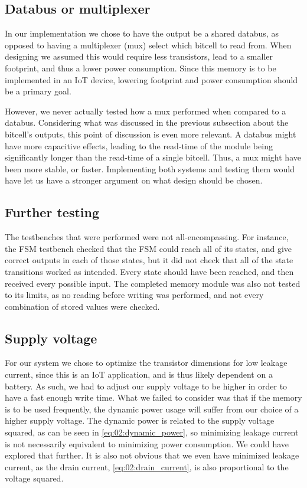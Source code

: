\subsection{Databus or multiplexer}
In our implementation we chose to have the output be a shared databus, as opposed to having a multiplexer (mux) select which bitcell to read from. When designing we assumed this would require less transistors, lead to a smaller footprint, and thus a lower power consumption. Since this memory is to be implemented in an IoT device, lowering footprint and power consumption should be a primary goal.

However, we never actually tested how a mux performed when compared to a databus. Considering what was discussed in the previous subsection about the bitcell's outputs, this point of discussion is even more relevant. A databus might have more capacitive effects, leading to the read-time of the module being significantly longer than the read-time of a single bitcell. Thus, a mux might have been more stable, or faster. Implementing both systems and testing them would have let us have a stronger argument on what design should be chosen.

\subsection{Further testing}
The testbenches that were performed were not all-encompassing. For instance, the FSM testbench checked that the FSM could reach all of its states, and give correct outputs in each of those states, but it did not check that all of the state transitions worked as intended. Every state should have been reached, and then received every possible input. The completed memory module was also not tested to its limits, as no reading before writing was performed, and not every combination of stored values were checked.

\subsection{Supply voltage}
For our system we chose to optimize the transistor dimensions for low leakage current, since this is an IoT application, and is thus likely dependent on a battery. As such, we had to adjust our supply voltage to be higher in order to have a fast enough write time. What we failed to consider was that if the memory is to be used frequently, the dynamic power usage will suffer from our choice of a higher supply voltage. The dynamic power is related to the supply voltage squared, as can be seen in \autoref{eq:02:dynamic_power}, so minimizing leakage current is not necessarily equivalent to minimizing power consumption. We could have explored that further. It is also not obvious that we even have minimized leakage current, as the drain current, \autoref{eq:02:drain_current}, is also proportional to the voltage squared.

